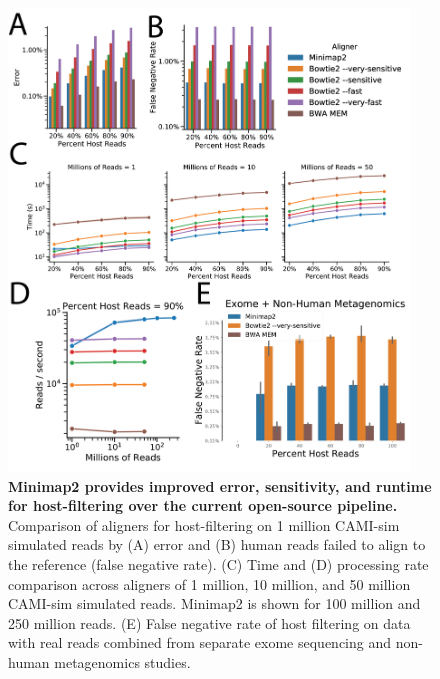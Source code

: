 \begin{figure}[htbp]
\centering
\includegraphics[width=0.95\textwidth]{host-filtering-figures/figure01.png}
\caption[Minimap2 provides improved error, sensitivity, and runtime for host-filtering over the current open-source pipeline.]{\textbf{Minimap2 provides improved error, sensitivity, and runtime for host-filtering over the current open-source pipeline.} Comparison of aligners for host-filtering on 1 million CAMI-sim simulated reads by (A) error and (B) human reads failed to align to the reference (false negative rate). (C) Time and (D) processing rate comparison across aligners of 1 million, 10 million, and 50 million CAMI-sim simulated reads. Minimap2 is shown for 100 million and 250 million reads. (E) False negative rate of host filtering on data with real reads combined from separate exome sequencing and non-human metagenomics studies.}
\label{host_filtering_fig1}
\end{figure}

